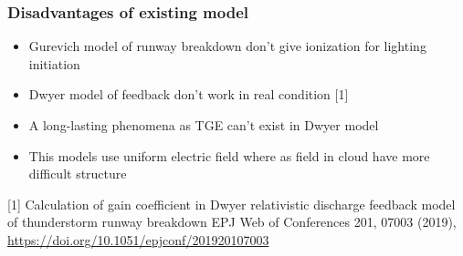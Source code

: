 \documentclass[8pt,pdf,hyperref={unicode}]{beamer}
\begin{document}
\begin{frame}
\begin{columns}
\begin{column}{0.5\textwidth}
\begin{itemize}
    \end{itemize}
\end{column}
\end{columns}

\end{frame}



\begin{frame}
\frametitle{Disadvantages of existing model}
\begin{itemize}
    \item Gurevich model of runway breakdown don't give ionization for lighting initiation
    \item Dwyer model of feedback don't work in real condition [1]
    \item A long-lasting phenomena as TGE  can't exist in Dwyer model
    \item This models use uniform electric field where as field in cloud have more difficult structure 
\end{itemize}
\small{[1] Calculation of gain coefficient in Dwyer relativistic discharge feedback model of thunderstorm runway breakdown
    EPJ Web of Conferences 201, 07003 (2019), \url{https://doi.org/10.1051/epjconf/201920107003}}
\end{frame}
\end{document}

